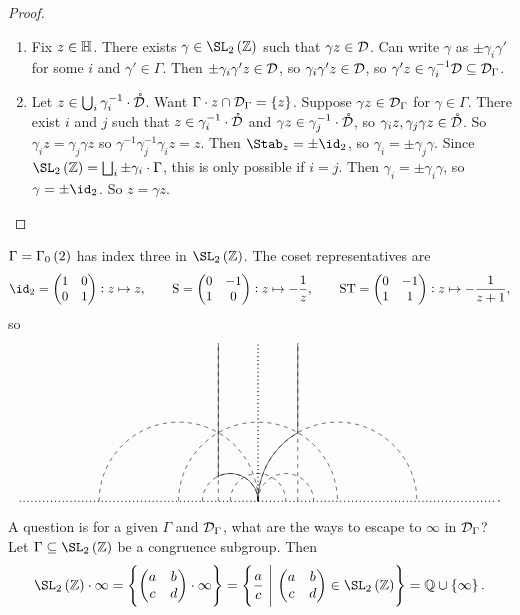 \begin{proof}
\hfill
\begin{enumerate}
\item Fix $ z \in \mathbb{H} $. There exists $ \gamma \in \SL_2\br{\ZZ} $ such that $ \gamma z \in \mathcal{D} $. Can write $ \gamma $ as $ \pm\gamma_i\gamma' $ for some $ i $ and $ \gamma' \in \Gamma $. Then $ \pm\gamma_i\gamma'z \in \mathcal{D} $, so $ \gamma_i\gamma'z \in \mathcal{D} $, so $ \gamma'z \in \gamma_i^{-1}\mathcal{D} \subseteq \mathcal{D}_\Gamma $.
\item Let $ z \in \bigcup_i \gamma_i^{-1} \cdot \mathring{\mathcal{D}} $. Want $ \Gamma \cdot z \cap \DDD_\Gamma = \cbr{z} $. Suppose $ \gamma z \in \mathcal{D}_\Gamma $ for $ \gamma \in \Gamma $. There exist $ i $ and $ j $ such that $ z \in \gamma_i^{-1} \cdot \mathring{\mathcal{D}} $ and $ \gamma z \in \gamma_j^{-1} \cdot \mathring{\mathcal{D}} $, so $ \gamma_iz, \gamma_j\gamma z \in \mathring{\mathcal{D}} $. So $ \gamma_iz = \gamma_j\gamma z $ so $ \gamma^{-1}\gamma_j^{-1}\gamma_iz = z $. Then $ \Stab_z = \pm\id_2 $, so $ \gamma_i = \pm\gamma_j\gamma $. Since $ \SL_2\br{\ZZ} = \bigsqcup_i \pm\gamma_i \cdot \Gamma $, this is only possible if $ i = j $. Then $ \gamma_i = \pm\gamma_i\gamma $, so $ \gamma = \pm\id_2 $. So $ z = \gamma z $.
\end{enumerate}
\end{proof}

\begin{example*}
$ \Gamma = \Gamma_0\br{2} $ has index three in $ \SL_2\br{\ZZ} $. The coset representatives are
$$ \id_2 = \twobytwo{1}{0}{0}{1} : z \mapsto z, \qquad \S = \twobytwo{0}{-1}{1}{0} : z \mapsto -\dfrac{1}{z}, \qquad \S\T = \twobytwo{0}{-1}{1}{1} : z \mapsto -\dfrac{1}{z + 1}, $$
so
$$
\begin{tikzpicture}[scale=2]
\draw [dotted, thick] (-3, 0) to (3, 0);
\draw [dotted, thick] (0, 0) to (0, 2);
\draw [dashed] (-2, 0) arc (180:0:1);
\draw [dashed] (-1, 0) arc (180:0:1);
\draw [dashed] (0, 0) arc (180:0:1);
\draw [dashed] (-0.7, 0) arc (180:0:0.35);
\draw [dashed] (-0.35, 0) arc (180:0:0.35);
\draw [dashed] (0, 0) arc (180:0:0.35);
\draw [dashed] (-0.5, 0) to (-0.5, 2);
\draw [dashed] (0.5, 0) to (0.5, 2);
\draw (0, 0) arc (0:120:0.35);
\draw (0, 0) arc (180:120:1);
\draw (-0.5, 0.3) to (-0.5, 2);
\draw (0.5, 0.866) to (0.5, 2);
\end{tikzpicture}.
$$
\end{example*}

A question is for a given $ \Gamma $ and $ \mathcal{D}_\Gamma $, what are the ways to escape to $ \infty $ in $ \mathcal{D}_\Gamma $? Let $ \Gamma \subseteq \SL_2\br{\ZZ} $ be a congruence subgroup. Then
$$ \SL_2\br{\ZZ} \cdot \infty = \cbr{\twobytwo{a}{b}{c}{d} \cdot \infty} = \cbr{\dfrac{a}{c} \st \twobytwo{a}{b}{c}{d} \in \SL_2\br{\ZZ}} = \QQ \cup \cbr{\infty}. $$

